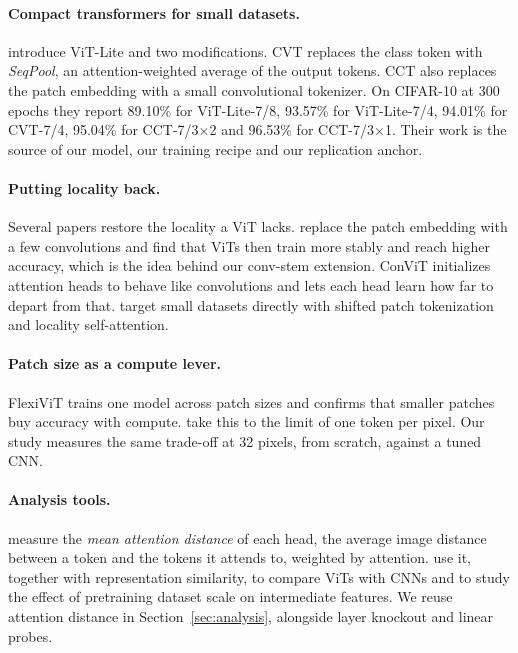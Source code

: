 \documentclass[11pt]{article}
\begin{document}
\paragraph{Compact transformers for small datasets.} \citet{hassani2021cct} introduce ViT-Lite and two modifications. CVT replaces the class token with \emph{SeqPool}, an attention-weighted average of the output tokens. CCT also replaces the patch embedding with a small convolutional tokenizer. On CIFAR-10 at 300 epochs they report 89.10\% for ViT-Lite-7/8, 93.57\% for ViT-Lite-7/4, 94.01\% for CVT-7/4, 95.04\% for CCT-7/3$\times$2 and 96.53\% for CCT-7/3$\times$1. Their work is the source of our model, our training recipe and our replication anchor.

\paragraph{Putting locality back.} Several papers restore the locality a ViT lacks. \citet{xiao2021early} replace the patch embedding with a few convolutions and find that ViTs then train more stably and reach higher accuracy, which is the idea behind our conv-stem extension. ConViT \citep{dascoli2021convit} initializes attention heads to behave like convolutions and lets each head learn how far to depart from that. \citet{lee2021spt} target small datasets directly with shifted patch tokenization and locality self-attention.

\paragraph{Patch size as a compute lever.} FlexiViT \citep{beyer2023flexivit} trains one model across patch sizes and confirms that smaller patches buy accuracy with compute. \citet{nguyen2024pixels} take this to the limit of one token per pixel. Our study measures the same trade-off at 32 pixels, from scratch, against a tuned CNN.

\paragraph{Analysis tools.} \citet{dosovitskiy2021vit} measure the \emph{mean attention distance} of each head, the average image distance between a token and the tokens it attends to, weighted by attention. \citet{raghu2021see} use it, together with representation similarity, to compare ViTs with CNNs and to study the effect of pretraining dataset scale on intermediate features. We reuse attention distance in Section~\ref{sec:analysis}, alongside layer knockout and linear probes.
\end{document}
